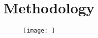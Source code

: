 \chapter{Methodology}
\label{chp:methodology}

\begin{figure}[htbp] %
   \centering
   \texttt{[image: ]} 
   \caption{}
   \label{}
\end{figure}

\section{}

\subsection{}

\subsection{}

\section{}

